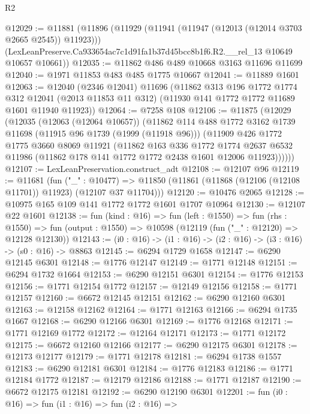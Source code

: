 \begin{lexlean}{R2}
\begin{coremodule}
@12029 := @11881
    (@11896
      (@11929 (@11941 (@11947 (@12013 (@12014 @3703 @2665 @2545)) @11923)))
      (LexLeanPreserve.Ca933654ac7c1d91fa1b37d45bcc8b1f6.R2.__rel_13 @10649 @10657 @10661))
@12035 := @11862 @486 @489 @10668 @3163 @11696 @11699
@12040 := @1971 @11853 @483 @485 @1775 @10667
@12041 := @11889 @1601
@12063 := @12040
    (@2346 @12041)
    @11696
    (@11862
      @313
      @196
      @1772
      @1774
      @312
      @12041
      (@2013 @11853 @11 @312)
      (@11930 @141 @1772 @1772 @11689 @1601 @11940 @11923))
@12064 := @7258 @108
@12106 := @11875
    (@12029
      (@12035
        (@12063 (@12064 @10657))
        (@11862
          @114
          @488
          @1772
          @3162
          @1739
          @11698
          (@11915 @96 @1739 (@1999 (@11918 @96)))
          (@11909
            @426
            @1772
            @1775
            @3660
            @8069
            @11921
            (@11862
              @163
              @336
              @1772
              @1774
              @2637
              @6532
              @11986
              (@11862 @178 @141 @1772 @1772 @2438 @1601 @12006 @11923))))))
@12107 := LexLeanPreservation.construct_adt
@12108 := @12107 @96
@12119 := @11681
    (fun ("_" : @10477) =>
    @11850 (@11861 (@11868 (@12106 (@12108 @11701)) @11923) (@12107 @37 @11704)))
@12120 := @10476 @2065
@12128 := @10975 @165 @109 @141 @1772 @1772 @1601 @1707 @10964
@12130 := @12107 @22 @1601
@12138 := fun (kind : @16) =>
  fun (left : @1550) =>
  fun (rhs : @1550) => fun (output : @1550) => @10598 (@12119 (fun ("_" : @12120) => @12128 @12130))
@12143 := (i0 : @16) -> (i1 : @16) -> (i2 : @16) -> (i3 : @16) -> (s0 : @16) -> @8863
@12145 := @6294 @1729 @1658
@12147 := @6290 @12145 @6301
@12148 := @1776 @12147
@12149 := @1771 @12148
@12151 := @6294 @1732 @1664
@12153 := @6290 @12151 @6301
@12154 := @1776 @12153
@12156 := @1771 @12154 @1772
@12157 := @12149 @12156
@12158 := @1771 @12157
@12160 := @6672 @12145 @12151
@12162 := @6290 @12160 @6301
@12163 := @12158 @12162
@12164 := @1771 @12163
@12166 := @6294 @1735 @1667
@12168 := @6290 @12166 @6301
@12169 := @1776 @12168
@12171 := @1771 @12169 @1772
@12172 := @12164 @12171
@12173 := @1771 @12172
@12175 := @6672 @12160 @12166
@12177 := @6290 @12175 @6301
@12178 := @12173 @12177
@12179 := @1771 @12178
@12181 := @6294 @1738 @1557
@12183 := @6290 @12181 @6301
@12184 := @1776 @12183
@12186 := @1771 @12184 @1772
@12187 := @12179 @12186
@12188 := @1771 @12187
@12190 := @6672 @12175 @12181
@12192 := @6290 @12190 @6301
@12201 := fun (i0 : @16) =>
  fun (i1 : @16) =>
  fun (i2 : @16) =>

\end{coremodule}
\end{lexlean}
